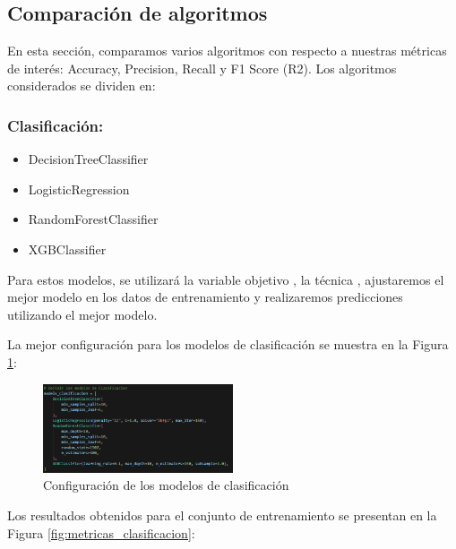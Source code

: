 \subsection{Comparación de algoritmos}

En esta sección, comparamos varios algoritmos con respecto a nuestras métricas de interés: Accuracy, Precision, Recall y F1 Score (R2). Los algoritmos considerados se dividen en:

\subsubsection*{Clasificación:}

\begin{itemize}
    \item DecisionTreeClassifier
    \item LogisticRegression
    \item RandomForestClassifier
    \item XGBClassifier
\end{itemize}

Para estos modelos, se utilizará la variable objetivo , la técnica , ajustaremos el mejor modelo en los datos de entrenamiento y realizaremos predicciones utilizando el mejor modelo.

La mejor configuración para los modelos de clasificación se muestra en la Figura \ref{fig:config_clasifiacion}:

\begin{figure}[H]
    \centering
    \includegraphics[width=0.5\textwidth]{img/compara_algoritmos/configModelsClasificacion.png}
    \caption{Configuración de los modelos de clasificación}
    \label{fig:config_clasifiacion}
\end{figure}

Los resultados obtenidos para el conjunto de entrenamiento se presentan en la Figura \ref{fig:metricas_clasificacion}:

